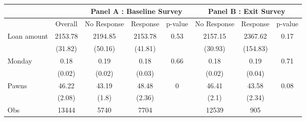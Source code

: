 \begin{tabular}{lcccc|ccc}
\toprule
      &       & \multicolumn{3}{c|}{Panel A : Baseline Survey} & \multicolumn{3}{c}{Panel B : Exit Survey} \\
\midrule
\midrule
      & Overall & No Response & Response & p-value & No Response & Response & p-value \\
\midrule
\midrule
Loan amount  & 2153.78 & 2194.85 & 2153.78 & 0.53  & 2157.15 & 2367.62 & 0.17 \\
      & (31.82) & (50.16) & (41.81) &       & (30.93) & (154.83) &  \\
Monday & 0.18  & 0.19  & 0.18  & 0.66  & 0.18  & 0.19  & 0.71 \\
      & (0.02) & (0.02) & (0.03) &       & (0.02) & (0.04) &  \\
Pawns & 46.22 & 43.19 & 48.48 & 0     & 46.41 & 43.58 & 0.08 \\
      & (2.08) & (1.8) & (2.36) &       & (2.1) & (2.34) &  \\
\midrule
Obs   & 13444 & 5740  & 7704  &       & 12539 & 905   &  \\
\bottomrule
\bottomrule
\end{tabular}%
